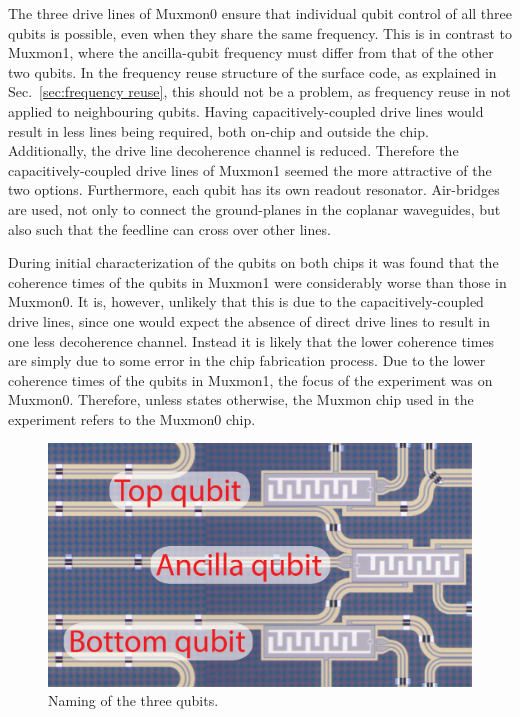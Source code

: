       The three drive lines of Muxmon0 ensure that individual qubit control of all three qubits is possible, even when they share the same frequency. This is in contrast to Muxmon1, where the ancilla-qubit frequency must differ from that of the other two qubits. In the frequency reuse structure of the surface code, as explained in Sec.~\ref{sec:frequency reuse}, this should not be a problem, as frequency reuse in not applied to neighbouring qubits. Having capacitively-coupled drive lines would result in less lines being required, both on-chip and outside the chip. Additionally, the drive line decoherence channel is reduced. Therefore the capacitively-coupled drive lines of Muxmon1 seemed the more attractive of the two options. Furthermore, each qubit has its own readout resonator. Air-bridges are used, not only to connect the ground-planes in the coplanar waveguides, but also such that the feedline can cross over other lines.

      During initial characterization of the qubits on both chips it was found that the coherence times of the qubits in Muxmon1 were considerably worse than those in Muxmon0. It is, however, unlikely that this is due to the capacitively-coupled drive lines, since one would expect the absence of direct drive lines to result in one less decoherence channel. Instead it is likely that the lower coherence times are simply due to some error in the chip fabrication process. Due to the lower coherence times of the qubits in Muxmon1, the focus of the experiment was on Muxmon0. Therefore, unless states otherwise, the Muxmon chip used in the experiment refers to the Muxmon0 chip.


      \begin{figure}
        \begin{center}
        \vspace{-30pt}
          \includegraphics[width=\textwidth]{Figures/Qubit names.jpg}
        \end{center}
        \vspace{-20 pt}
        \caption{Naming of the three qubits.}
        \label{fig:Qubit names}
      \end{figure}


